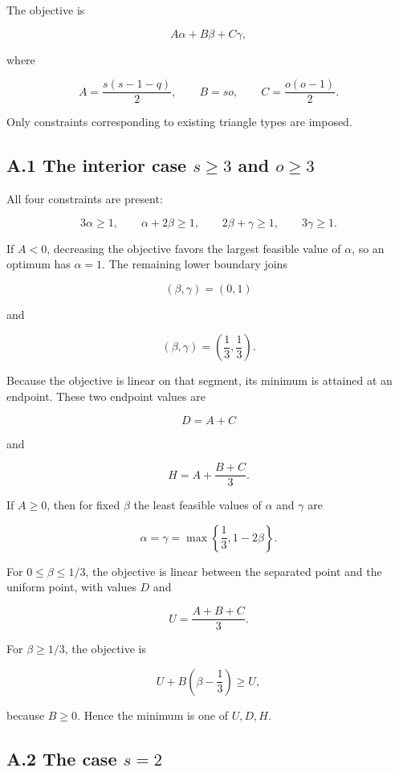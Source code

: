 \documentclass[
  11pt,
]{article}
\begin{document}
The objective is

\[
A\alpha+B\beta+C\gamma,
\]

where

\[
A=\frac{s(s-1-q)}2,
\qquad
B=so,
\qquad
C=\frac{o(o-1)}2.
\]

Only constraints corresponding to existing triangle types are imposed.

\subsection{\texorpdfstring{A.1 The interior case \(s\ge3\) and
\(o\ge3\)}{A.1 The interior case s\textbackslash ge3 and o\textbackslash ge3}}\label{a.1-the-interior-case-sge3-and-oge3}

All four constraints are present:

\[
3\alpha\ge1,
\qquad
\alpha+2\beta\ge1,
\qquad
2\beta+\gamma\ge1,
\qquad
3\gamma\ge1.
\]

If \(A<0\), decreasing the objective favors the largest feasible value
of \(\alpha\), so an optimum has \(\alpha=1\). The remaining lower
boundary joins

\[
(\beta,\gamma)=(0,1)
\]

and

\[
(\beta,\gamma)=\left(\frac13,\frac13\right).
\]

Because the objective is linear on that segment, its minimum is attained
at an endpoint. These two endpoint values are

\[
D=A+C
\]

and

\[
H=A+\frac{B+C}{3}.
\]

If \(A\ge0\), then for fixed \(\beta\) the least feasible values of
\(\alpha\) and \(\gamma\) are

\[
\alpha=\gamma=\max\left\{\frac13,1-2\beta\right\}.
\]

For \(0\le\beta\le1/3\), the objective is linear between the separated
point and the uniform point, with values \(D\) and

\[
U=\frac{A+B+C}{3}.
\]

For \(\beta\ge1/3\), the objective is

\[
U+B\left(\beta-\frac13\right)\ge U,
\]

because \(B\ge0\). Hence the minimum is one of \(U,D,H\).

\subsection{\texorpdfstring{A.2 The case
\(s=2\)}{A.2 The case s=2}}\label{a.2-the-case-s2}
\end{document}
